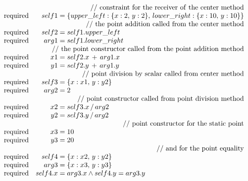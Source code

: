 \documentclass{article}
\begin{document}
$\begin{array}{rr@{\;=\;}l}
\multicolumn{3}{r}{//~\mathrm{constraint~for~the~receiver~of~the~center~method}} \\
\mathrm{required} & self1 & \{upper\_left: \{x:2,\,y:2\},\,lower\_right: \{x:10,\,y:10\}\}\\

\multicolumn{3}{r}{//~\mathrm{the~point~addition~called~from~the~center~method}} \\
\mathrm{required} & self2 & self1.upper\_left\\
\mathrm{required} & arg1 & self1.lower\_right\\

\multicolumn{3}{r}{//~\mathrm{the~point~constructor~called~from~the~point~addition~method}} \\
\mathrm{required} & x1 & self2.x\,+\,arg1.x\\
\mathrm{required} & y1 & self2.y\,+\,arg1.y\\

\multicolumn{3}{r}{//~\mathrm{point~division~by~scalar~called~from~center~method}} \\
\mathrm{required} & self3 & \{x: x1,\,y: y2\}\\
\mathrm{required} & arg2 & 2\\

\multicolumn{3}{r}{//~\mathrm{point~constructor~called~from~point~division~method}} \\
\mathrm{required} & x2 & self3.x\,/\,arg2\\
\mathrm{required} & y2 & self3.y\,/\,arg2\\

\multicolumn{3}{r}{\mycskip\mathrm{//~point~constructor~for~the~static~point}} \\
\mathrm{required} & x3 & 10\\
\mathrm{required} & y3 & 20\\

\multicolumn{3}{r}{//~\mathrm{and~for~the~point~equality}} \\
\mathrm{required} & self4 & \{x: x2,\,y: y2\}\\
\mathrm{required} & arg3 & \{x: x3,\,y: y3\}\\
\mathrm{required} & self4.x & arg3.x \wedge self4.y = arg3.y\\
\end{array}$
\end{document}
